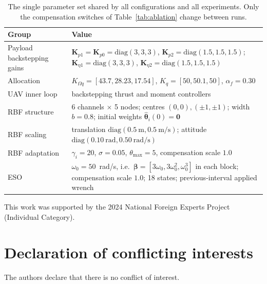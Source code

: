 \documentclass[Review,sageh,times]{sagej}
\begin{document}
\begin{table}[t]
\centering
\caption{The single parameter set shared by all configurations and all
experiments. Only the compensation switches of Table~\ref{tab:ablation} change between
runs.}
\label{tab:gains}
\scriptsize
\setlength{\tabcolsep}{4pt}
\begin{tabular}{@{}p{}p{}@{}}
\hline
Group & Value\\
\hline
Payload backstepping gains &
$\mathbf{K}_{p1}=\mathbf{K}_{p0}=\mathrm{diag}(3,3,3)$, $\mathbf{K}_{p2}=\mathrm{diag}(1.5,1.5,1.5)$;
$\mathbf{K}_{\eta1}=\mathrm{diag}(3,3,3)$, $\mathbf{K}_{\eta2}=\mathrm{diag}(1.5,1.5,1.5)$\\
Allocation &
$K_{\Omega q}=[43.7,28.23,17.54]$, $K_q=[50,50.1,50]$, $\alpha_f=0.30$\\
UAV inner loop & backstepping thrust and moment controllers\\
RBF structure &
6 channels $\times$ 5 nodes; centres $(0,0),(\pm1,\pm1)$; width $b=0.8$;
initial weights $\hat{\boldsymbol{\theta}}_i(0)=\mathbf{0}$\\
RBF scaling &
translation $\mathrm{diag}(0.5\ \mathrm{m},0.5\ \mathrm{m/s})$;
attitude $\mathrm{diag}(0.10\ \mathrm{rad},0.50\ \mathrm{rad/s})$\\
RBF adaptation &
$\gamma_i=20$, $\sigma=0.05$, $\theta_{\max}=5$, compensation scale $1.0$\\
ESO &
$\omega_0=50$~rad/s, i.e.\ $\boldsymbol{\beta}=[3\omega_0,3\omega_0^{2},\omega_0^{3}]$ in each block;
compensation scale $1.0$; 18 states; previous-interval applied wrench\\
\hline
\end{tabular}
\end{table}

\begin{acks}
{This work was supported by the 2024 National Foreign Experts Project (Individual Category).}
\end{acks}

\section*{Declaration of conflicting interests}

The authors declare that there is no conflict of interest.
\end{document}
